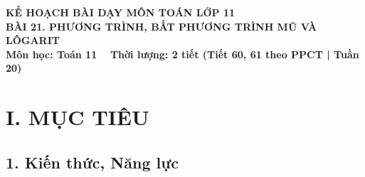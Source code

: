 \documentclass[12pt, a4paper]{article}
\begin{document}
\begin{center}
    {\fontsize{14pt}{17pt}\selectfont \textbf{KẾ HOẠCH BÀI DẠY MÔN TOÁN LỚP 11}}\\[6pt]
    {\fontsize{16pt}{19pt}\selectfont \textbf{BÀI 21. PHƯƠNG TRÌNH, BẤT PHƯƠNG TRÌNH MŨ VÀ LÔGARIT}}\\[4pt]
    {\fontsize{12pt}{15pt}\selectfont \textbf{Môn học: Toán 11} \ \textbar \ \textbf{Thời lượng: 2 tiết (Tiết 60, 61 theo PPCT | Tuần 20)}}
\end{center}

\vspace{5pt}

\section*{I. MỤC TIÊU}

\subsection*{1. Kiến thức, Năng lực}
\end{document}
